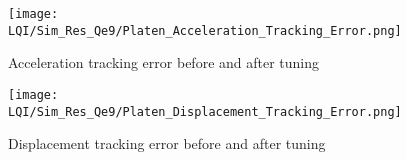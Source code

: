 \begin{figure}[H]
\begin{minipage}{0.49\textwidth}
    \centering
    \texttt{[image: LQI/Sim\_Res\_Qe9/Platen\_Acceleration\_Tracking\_Error.png]}
    \caption{Acceleration tracking error before and after tuning}
    \label{fig_Platen_Acceleration_Tracking_Error}
\end{minipage}
\hfill
\begin{minipage}{0.49\textwidth}
    \centering
    \texttt{[image: LQI/Sim\_Res\_Qe9/Platen\_Displacement\_Tracking\_Error.png]}
    \caption{Displacement tracking error before and after tuning}
    \label{fig_Platen_Displacement_Tracking_Error}
\end{minipage}
\end{figure}
